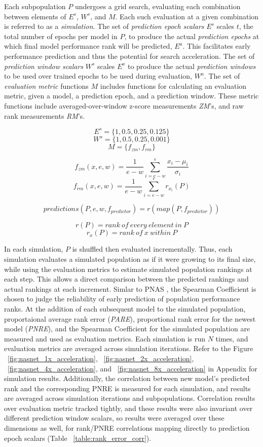 \documentclass[twocolumn]{article}
\begin{document}
Each subpopulation $P$ undergoes a grid search, evaluating each combination between elements of $E^s$, $W^s$, and $M$.
Each such evaluation at a given combination is referred to as a \emph{simulation}.
The set of \emph{prediction epoch scalars} $E^s$ scales $t$, the total number of epochs per model in $P$,
to produce the actual \emph{prediction epochs} at which final model performance rank will be predicted, $E^{a}$.
This facilitates early performance prediction and thus the potential for search acceleration.
The set of \emph{prediction window scalars} $W^s$ scales $E^a$ to produce the actual \emph{prediction windows} to be used 
over trained epochs to be used during evaluation, $W^a$.
The set of \emph{evaluation metric} functions $M$ includes functions for calculating an evaluation metric,
given a model, a prediction epoch, and a prediction window. 
These metric functions include averaged-over-window z-score measurements \emph{ZM}'s, and raw rank measurements \emph{RM}'s.

\[E^s = \{1, 0.5, 0.25, 0.125\}\]
\[W^s = \{1, 0.5, 0.25, 0.001\}\]
\[M = \{f_{zm}, f_{rm}\}\]

\[f_{zm}(x, e, w) = \frac{1}{e-w}\sum_{i=e-w}^{e}\frac{x_i - \mu_i}{\sigma_i}\]
\[f_{rm}(x, e, w) = \frac{1}{e-w}\sum_{i=e-w}^{e}r_{x_{i}}(P)\]

\[predictions(P, e, w, f_{predictor}) = r(map(P, f_{predictor}))\]

\[r(P) = rank\ of\ every\ element\ in\ P\]
\[r_{x}(P) = rank\ of\ x\ within\ P\]

In each simulation, $P$ is shuffled then evaluated incrementally.
Thus, each simulation evaluates a simulated population as if it were growing to its final size, while using
the evaluation metrics to estimate simulated population rankings at each step.
This allows a direct comparison between the predicted rankings and actual rankings at each increment.
Simlar to PNAS \cite{pnas}, the Spearman Coefficient is chosen to judge the reliability of early prediction of population performance ranks.
At the addition of each subsequent model to the simulated population, proportaional average rank error (\emph{PARE}), proportional rank error for the newest model (\emph{PNRE}), and the Spearman Coefficient
for the simulated population are measured and used as evaluation metrics. 
Each simulation is run $N$ times, and evaluation metrics are averaged across simulation iterations. 
Refer to the Figure ~\ref{fig:nasnet_1x_acceleration}, ~\ref{fig:nasnet_2x_acceleration}, ~\ref{fig:nasnet_4x_acceleration}, and ~\ref{fig:nasnet_8x_acceleration} in Appendix for simulation results.
Additionally, the correlation between new model's predicted rank and the corresponding PNRE is measured for each simulation,
and results are averaged across simulation iterations and subpopulations. 
Correlation results over evaluation metric tracked tightly, and these results were also invariant over different prediction window scalars, so results were averaged over
these dimensions as well, for rank/PNRE correlations mapping directly to prediction epoch scalars (Table ~\ref{table:rank_error_corr}).
\end{document}
